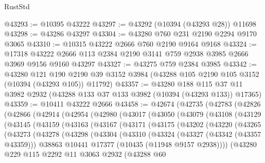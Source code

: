 \begin{lexlean}{RustStd}
\begin{coremodule}
@43293 := @10395 @43222
@43297 := @43292 (@10394 (@43293 @28)) @11698
@43298 := @43286 @43297
@43304 := @43280 @760 @231 @2190 @2294 @9170 @3065
@43310 := @10315 @43222 @2666 @760 @2190 @9164 @9168
@43324 := @17318 @43222 @2666 @113 @2384 @2190 @3141 @759 @2938 @3985 @2666 @3969 @9156 @9160 @43297
@43327 := @43275 @759 @2384 @3985
@43342 := @43280
    @121
    @190
    @2190
    @39
    @3152
    @3984
    (@43288 @105 @2190 @105 @3152 (@10394 (@43293 @105)) @11792)
@43357 := @43280
    @188
    @115
    @37
    @11
    @3982
    @2932
    (@43288 @133 @37 @133 @3982 (@10394 (@43293 @133)) @17365)
@43359 := @10411 @43222 @2666
@43458 := @42674
    (@42735
      (@42783
        (@42826
          (@42866
            (@42914
              (@42954
                (@42980
                  (@43017
                    (@43050
                      (@43079
                        (@43108
                          (@43129
                            (@43145
                              (@43159
                                (@43163
                                  (@43167
                                    (@43171
                                      (@43175
                                        (@43202
                                          (@43220
                                            (@43265
                                              (@43273
                                                (@43278
                                                  (@43298
                                                    (@43304
                                                      (@43310
                                                        (@43324
                                                          (@43327 (@43342 (@43357 @43359)))
                                                          @38863
                                                          @10441
                                                          @17377
                                                          (@10435 (@11948 @9157 @2938))))
                                                      (@43280
                                                        @229
                                                        @115
                                                        @2292
                                                        @11
                                                        @3063
                                                        @2932
                                                        (@43288
                                                          @60

\end{coremodule}
\end{lexlean}

